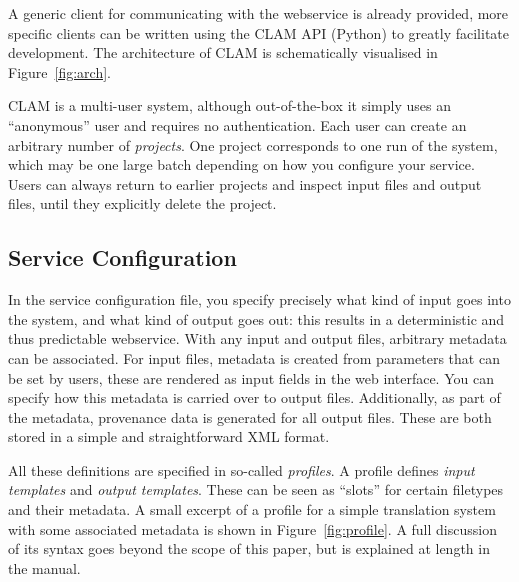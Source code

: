\documentclass[11pt]{article}
\begin{document}
A generic client for communicating with the webservice is already provided,
more specific clients can be written using the CLAM API (Python) to greatly
facilitate development. The architecture of CLAM is schematically visualised in
Figure~\ref{fig:arch}.

CLAM is a multi-user system, although out-of-the-box it simply uses an
``anonymous'' user and requires no authentication. Each user can create an
arbitrary number of \emph{projects}. One project corresponds to one run of the
system, which may be one large batch depending on how you configure your
service. Users can always return to earlier projects and inspect input files
and output files, until they explicitly delete the project.


\subsection{Service Configuration}

In the service configuration file, you specify precisely what kind of input
goes into the system, and what kind of output goes out: this results in a
deterministic and thus predictable webservice.  With any input and output
files, arbitrary metadata can be associated. For input files, metadata is
created from parameters that can be set by users, these are rendered as input
fields in the web interface.  You can specify how this metadata is carried over
to output files.  Additionally, as part of the metadata, provenance data is
generated for all output files. These are both stored in a simple and
straightforward XML format.

All these definitions are specified in so-called \emph{profiles}. A profile
defines \emph{input templates} and \emph{output templates}. These can be seen
as ``slots'' for certain filetypes and their metadata. A small excerpt of a
profile for a simple translation system with some associated metadata is shown
in Figure~\ref{fig:profile}. A full discussion of its syntax goes beyond the
scope of this paper, but is explained at length in the manual.
\end{document}
